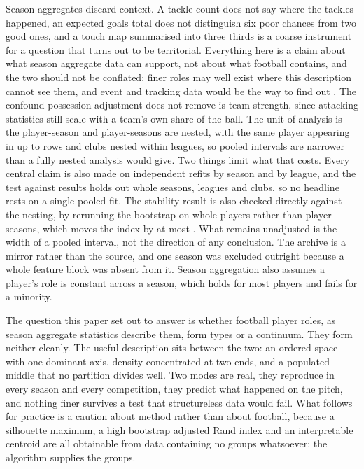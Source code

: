 Season aggregates discard context. A tackle count does not say where the tackles happened, an
expected goals total does not distinguish six poor chances from two good ones, and a touch map
summarised into three thirds is a coarse instrument for a question that turns out to be
territorial. Everything here is a claim about what season aggregate data can support, not about
what football contains, and the two should not be conflated: finer roles may well exist where this
description cannot see them, and event and tracking data would be the way to find out
\citep{pappalardo2019playerank, aalbers2019distinguishing}. The confound possession adjustment
does not remove is team strength, since attacking statistics still scale with a team's own share
of the ball. The unit of analysis is the player-season and player-seasons are nested, with the
same player appearing in up to \ArcNSeasonsWord{} rows and clubs nested within leagues, so pooled
intervals are narrower than a fully nested analysis would give. Two things limit what that costs.
Every central claim is also made on independent refits by season and by league, and the test
against results holds out whole seasons, leagues and clubs, so no headline rests on a single
pooled fit. The stability result is also checked directly against the nesting, by rerunning the
bootstrap on whole players rather than player-seasons, which moves the index by at most
\NestLargestFall{}. What remains unadjusted is the width of a pooled interval, not the direction
of any conclusion. The archive is
a mirror rather than the source, and one season was excluded outright because a whole feature
block was absent from it. Season aggregation also assumes a player's role is constant across a
season, which holds for most players and fails for a minority.

The question this paper set out to answer is whether football player roles, as season aggregate
statistics describe them, form types or a continuum. They form neither cleanly. The useful
description sits between the two: an ordered space with one dominant axis, density concentrated at
two ends, and a populated middle that no partition divides well. Two modes are real, they
reproduce in every season and every competition, they predict what happened on the pitch, and
nothing finer survives a test that structureless data would fail. What follows for practice is a
caution about method rather than about football, because a silhouette maximum, a high bootstrap
adjusted Rand index and an interpretable centroid are all obtainable from data containing no
groups whatsoever: the algorithm supplies the groups.
